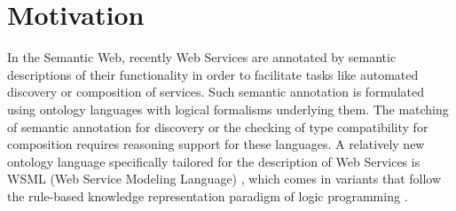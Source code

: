 \section{Motivation\label{sec:motivation}}

In the Semantic Web, recently Web Services are annotated by
semantic descriptions of their functionality in order to
facilitate tasks like automated discovery or composition of
services. Such semantic annotation is formulated using ontology
languages with logical formalisms underlying them. The matching of
semantic annotation for discovery or the checking of type
compatibility for composition requires reasoning support for these
languages. A relatively new ontology language specifically
tailored for the description of Web Services is WSML (Web Service
Modeling Language) \cite{wsml}, which comes in variants that
follow the rule-based knowledge representation paradigm of logic
programming \cite{lloyd-FoundationsOfLP}.

